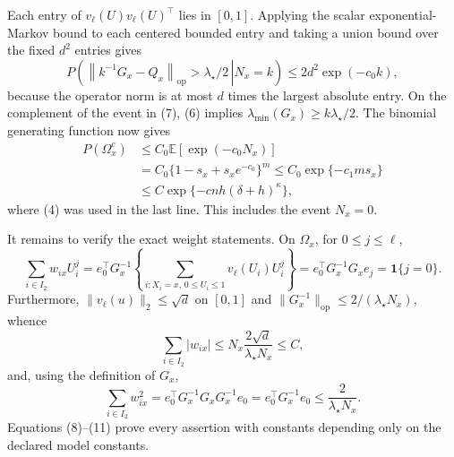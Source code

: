 Each entry of \(v_\ell(U)v_\ell(U)^\top\) lies in \([0,1]\).  Applying the scalar exponential-Markov bound to each centered bounded entry and taking a union bound over the fixed \(d^2\) entries gives
\[
 P\left(\left.\left\|k^{-1}G_x-Q_x\right\|_{\mathrm{op}}>\lambda_\star/2\,\right|N_x=k\right)
 \leq 2d^2\exp(-c_0k), \tag{7}
\]
because the operator norm is at most \(d\) times the largest absolute entry.  On the complement of the event in (7), (6) implies \(\lambda_{\min}(G_x)\geq k\lambda_\star/2\).  The binomial generating function now gives
\[
 \begin{aligned}
 P(\Omega_x^c)
 &\leq C_0\mathbb E[\exp(-c_0N_x)]\\
 &=C_0\{1-s_x+s_xe^{-c_0}\}^{m}
 \leq C_0\exp\{-c_1ms_x\}\\
 &\leq C\exp\{-cnh(\delta+h)^\kappa\},
 \end{aligned} \tag{8}
\]
where (4) was used in the last line.  This includes the event \(N_x=0\).

It remains to verify the exact weight statements.  On \(\Omega_x\), for \(0\leq j\leq\ell\),
\[
 \sum_{i\in I_2}w_{ix}U_i^j
 =e_0^\top G_x^{-1}\left\{\sum_{i:X_i=x,\,0\leq U_i\leq1}v_\ell(U_i)U_i^j\right\}
 =e_0^\top G_x^{-1}G_xe_j
 =\mathbf 1\{j=0\}. \tag{9}
\]
Furthermore, \(\lVert v_\ell(u)\rVert_2\leq\sqrt d\) on \([0,1]\) and \(\lVert G_x^{-1}\rVert_{\mathrm{op}}\leq2/(\lambda_\star N_x)\), whence
\[
 \sum_{i\in I_2}|w_{ix}|
 \leq N_x\frac{2\sqrt d}{\lambda_\star N_x}
 \leq C, \tag{10}
\]
and, using the definition of \(G_x\),
\[
 \sum_{i\in I_2}w_{ix}^2
 =e_0^\top G_x^{-1}G_xG_x^{-1}e_0
 =e_0^\top G_x^{-1}e_0
 \leq\frac{2}{\lambda_\star N_x}. \tag{11}
\]
Equations (8)--(11) prove every assertion with constants depending only on the declared model constants.
